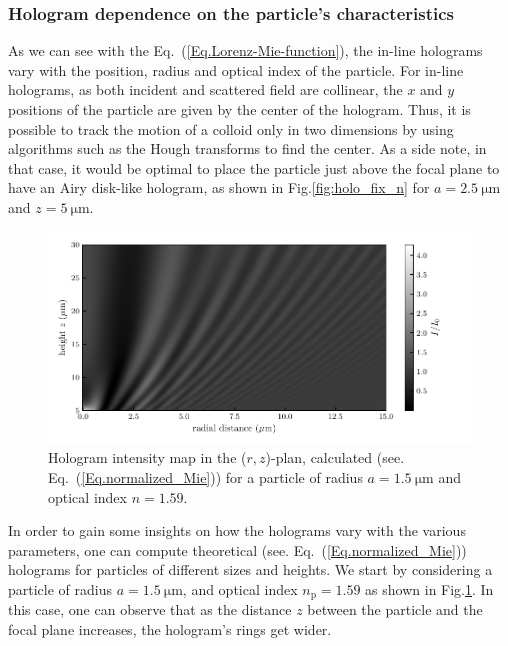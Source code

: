 \subsubsection{Hologram dependence on the particle's  characteristics}



As we can see with the Eq.~(\ref{Eq.Lorenz-Mie-function}), the in-line holograms vary with the position, radius and optical index of the particle. For in-line holograms, as both incident and scattered field are collinear, the $x$ and $y$ positions of the particle are given by the center of the hologram. Thus, it is possible to track the motion of a colloid only in two dimensions by using algorithms such as the Hough transforms to find the center. As a side note, in that case, it would be optimal to place the particle just above the focal plane to have an Airy disk-like hologram, as shown in Fig.\ref{fig:holo_fix_n} for $a = 2.5 ~ \mathrm{\mu m}$ and $z = 5 ~\mathrm{\mu m}$.

\begin{figure}[H]
	\centering
	\includegraphics{02_body/chapter2/images/holo_size_exemple/holos_only_z.pdf}
	\caption{Hologram intensity map in the ($r,z$)-plan, calculated (see. Eq.~(\ref{Eq.normalized_Mie})) for a particle of radius $a = 1.5 ~\mathrm{\mu m}$ and optical index $n = 1.59$.~\href{https://github.com/eXpensia/Confined-Brownian-Motion/blob/main/02_body/chapter2/images/holo_size_exemple/holosize_variation.ipynb}{\faGithub}}
	\label{fig:holo_onlyz}
\end{figure}

In order to gain some insights on how the holograms vary with the various parameters, one can compute theoretical (see. Eq.~(\ref{Eq.normalized_Mie})) holograms for particles of different sizes and heights. We start by considering a particle of radius $a = 1.5 ~ \mathrm{\mu m} $, and optical index $n_\mathrm{p}= 1.59 $ as shown in Fig.\ref{fig:holo_onlyz}. In this case, one can observe that as the distance $z$ between the particle and the focal plane increases, the hologram's rings get wider.


